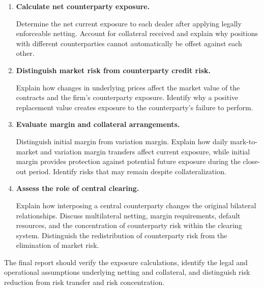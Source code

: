 \begin{enumerate}

\item \textbf{Calculate net counterparty exposure.}

Determine the net current exposure to each dealer
after applying legally enforceable netting.
Account for collateral received and explain why
positions with different counterparties cannot
automatically be offset against each other.

\item \textbf{Distinguish market risk from
counterparty credit risk.}

Explain how changes in underlying prices affect
the market value of the contracts and the firm's
counterparty exposure. Identify why a positive
replacement value creates exposure to the
counterparty's failure to perform.

\item \textbf{Evaluate margin and collateral
arrangements.}

Distinguish initial margin from variation margin.
Explain how daily mark-to-market and variation
margin transfers affect current exposure, while
initial margin provides protection against
potential future exposure during the close-out
period. Identify risks that may remain despite
collateralization.

\item \textbf{Assess the role of central clearing.}

Explain how interposing a central counterparty
changes the original bilateral relationships.
Discuss multilateral netting, margin requirements,
default resources, and the concentration of
counterparty risk within the clearing system.
Distinguish the redistribution of counterparty
risk from the elimination of market risk.

\end{enumerate}

The final report should verify the exposure
calculations, identify the legal and operational
assumptions underlying netting and collateral,
and distinguish risk reduction from risk transfer
and risk concentration.



